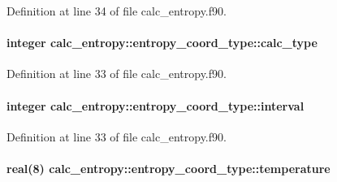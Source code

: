 Definition at line 34 of file calc\-\_\-entropy.\-f90.

\hypertarget{structcalc__entropy_1_1entropy__coord__type_a97edc94365c6b3b86c5eebda44ea8f4b}{
\paragraph[{calc\-\_\-type}]{\setlength{\rightskip}{0pt plus 5cm}integer calc\-\_\-entropy\-::entropy\-\_\-coord\-\_\-type\-::calc\-\_\-type}}\label{structcalc__entropy_1_1entropy__coord__type_a97edc94365c6b3b86c5eebda44ea8f4b}


Definition at line 33 of file calc\-\_\-entropy.\-f90.

\hypertarget{structcalc__entropy_1_1entropy__coord__type_abb056ea5be35d22a42a119a69c98ee35}{
\paragraph[{interval}]{\setlength{\rightskip}{0pt plus 5cm}integer calc\-\_\-entropy\-::entropy\-\_\-coord\-\_\-type\-::interval}}\label{structcalc__entropy_1_1entropy__coord__type_abb056ea5be35d22a42a119a69c98ee35}


Definition at line 33 of file calc\-\_\-entropy.\-f90.

\hypertarget{structcalc__entropy_1_1entropy__coord__type_ad340c0c4f4f7d6ce65f684f9a9c35668}{
\paragraph[{temperature}]{\setlength{\rightskip}{0pt plus 5cm}real(8) calc\-\_\-entropy\-::entropy\-\_\-coord\-\_\-type\-::temperature}}\label{structcalc__entropy_1_1entropy__coord__type_ad340c0c4f4f7d6ce65f684f9a9c35668}


